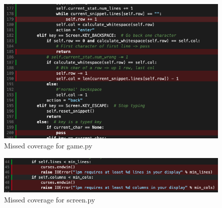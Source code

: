 \documentclass[12pt, titlepage]{article}
\begin{document}
\begin{figure}[H]
    \centering
    \includegraphics[width=\textwidth]{cov_game.png}
    \caption{Missed coverage for game.py}
    \label{fig:cov_game}
\end{figure}

\begin{figure}[H]
    \centering
    \includegraphics[width=\textwidth]{cov_screen.png}
    \caption{Missed coverage for screen.py}
    \label{fig:cov_screen}
\end{figure}
\end{document}
